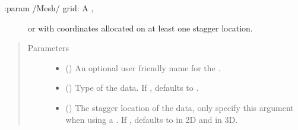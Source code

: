 \documentclass[letterpaper,10pt,english]{sphinxmanual}
\begin{document}
\begin{fulllineitems}
\begin{description}
\item[{:param {\hyperref[\detokenize{grid:ESMF.api.grid.Grid}]{}}/Mesh/{\hyperref[\detokenize{locstream:ESMF.api.locstream.LocStream}]{}} grid: A {\hyperref[\detokenize{grid:ESMF.api.grid.Grid}]{}},}] \leavevmode
{\hyperref[\detokenize{mesh:ESMF.api.mesh.Mesh}]{}} or {\hyperref[\detokenize{locstream:ESMF.api.locstream.LocStream}]{}}
with coordinates allocated on at least one stagger location.

\end{description}

\begin{quote}\begin{description}
\item[{Parameters}] \leavevmode\begin{itemize}
\item {} 
 () \textendash{} An optional user friendly name for the
{\hyperref[\detokenize{field:ESMF.api.field.Field}]{}}.

\item {} 
 ({\hyperref[\detokenize{TypeKind:ESMF.api.constants.TypeKind}]{}}) \textendash{} Type of the {\hyperref[\detokenize{field:ESMF.api.field.Field}]{}}
data. If , defaults to {\hyperref[\detokenize{TypeKind:ESMF.api.constants.TypeKind.R8}]{}}.

\item {} 
 ({\hyperref[\detokenize{StaggerLoc:ESMF.api.constants.StaggerLoc}]{}}) \textendash{} The stagger location of the
{\hyperref[\detokenize{field:ESMF.api.field.Field}]{}} data, only specify this argument when
using a {\hyperref[\detokenize{grid:ESMF.api.grid.Grid}]{}}.
If , defaults to {\hyperref[\detokenize{StaggerLoc:ESMF.api.constants.StaggerLoc.CENTER}]{}}
in 2D and {\hyperref[\detokenize{StaggerLoc:ESMF.api.constants.StaggerLoc.CENTER_VCENTER}]{}} in 3D.


\end{itemize}
\end{description}
\end{quote}
\end{fulllineitems}
\end{document}
